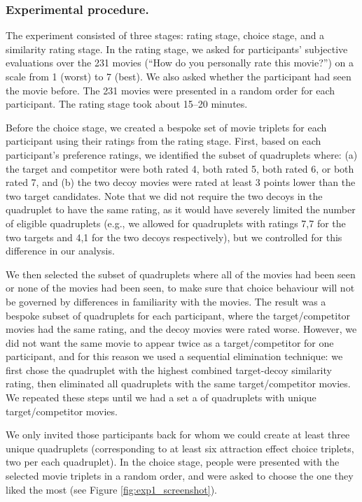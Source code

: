 \documentclass[12pt, a4paper]{article}
\begin{document}
\subsubsection*{Experimental procedure.}

The experiment consisted of three stages: rating stage, choice stage, and a similarity rating stage. In the rating stage, we asked for participants' subjective evaluations over the 231 movies (``How do you personally rate this movie?'') on a scale from 1 (worst) to 7 (best). We also asked whether the participant had seen the movie before. The 231 movies were presented in a random order for each participant. The rating stage took about 15--20 minutes.

Before the choice stage, we created a bespoke set of movie triplets for each participant using their ratings from the rating stage. First, based on each participant's preference ratings, we identified the subset of quadruplets where: (a) the target and competitor were both rated 4, both rated 5, both rated 6, or both rated 7, and (b) the two decoy movies were rated at least 3 points lower than the two target candidates. Note that we did not require the two decoys in the quadruplet to have the same rating, as it would have severely limited the number of eligible quadruplets (e.g., we allowed for quadruplets with ratings 7,7 for the two targets and 4,1 for the two decoys respectively), but we controlled for this difference in our analysis.

We then selected the subset of quadruplets where all of the movies had been seen or none of the movies had been seen, to make sure that choice behaviour will not be governed by differences in familiarity with the movies. The result was a bespoke subset of quadruplets for each participant, where the target/competitor movies had the same rating, and the decoy movies were rated worse. However, we did not want the same movie to appear twice as a target/competitor for one participant, and for this reason we used a sequential elimination technique: we first chose the quadruplet with the highest combined target-decoy similarity rating, then eliminated all quadruplets with the same target/competitor movies. We repeated these steps until we had a set a of quadruplets with unique target/competitor movies.

We only invited those participants back for whom we could create at least three unique quadruplets (corresponding to at least six attraction effect choice triplets, two per each quadruplet). In the choice stage, people were presented with the selected movie triplets in a random order, and were asked to choose the one they liked the most (see Figure \ref{fig:exp1_screenshot}).
\end{document}
